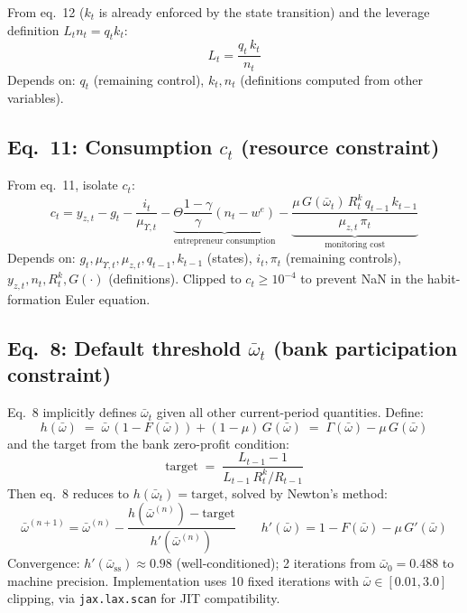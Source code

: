 From eq.~12 ($k_t$ is already enforced by the state transition) and the
leverage definition $L_t n_t = q_t k_t$:
\begin{equation*}
  \boxed{L_t = \frac{q_t\, k_t}{n_t}}
\end{equation*}
Depends on: $q_t$ (remaining control), $k_t, n_t$ (definitions computed from other variables).

\subsection*{Eq.~11: Consumption $c_t$ (resource constraint)}

From eq.~11, isolate $c_t$:
\begin{equation*}
  \boxed{c_t = y_{z,t} - g_t - \frac{i_t}{\mu_{\Upsilon,t}}
    - \underbrace{\Theta\frac{1-\gamma}{\gamma}(n_t - w^e)}_{\text{entrepreneur consumption}}
    - \underbrace{\frac{\mu\, G(\bar\omega_t)\, R_t^k\, q_{t-1}\, k_{t-1}}{\mu_{z,t}\,\pi_t}}_{\text{monitoring cost}}}
\end{equation*}
Depends on: $g_t, \mu_{\Upsilon,t}, \mu_{z,t}, q_{t-1}, k_{t-1}$ (states),
$i_t, \pi_t$ (remaining controls), $y_{z,t}, n_t, R_t^k, G(\cdot)$ (definitions).
Clipped to $c_t \geq 10^{-4}$ to prevent NaN in the habit-formation Euler equation.

\subsection*{Eq.~8: Default threshold $\bar\omega_t$ (bank participation constraint)}

Eq.~8 implicitly defines $\bar\omega_t$ given all other current-period quantities.
Define:
\begin{equation*}
  h(\bar\omega) \;=\; \bar\omega\,(1-F(\bar\omega)) + (1-\mu)\,G(\bar\omega)
  \;=\; \Gamma(\bar\omega) - \mu\,G(\bar\omega)
\end{equation*}
and the target from the bank zero-profit condition:
\begin{equation*}
  \text{target} \;=\; \frac{L_{t-1} - 1}{L_{t-1}\, R_t^k / R_{t-1}}
\end{equation*}
Then eq.~8 reduces to $h(\bar\omega_t) = \text{target}$, solved by Newton's method:
\begin{equation*}
  \boxed{\bar\omega^{(n+1)} = \bar\omega^{(n)}
    - \frac{h(\bar\omega^{(n)}) - \text{target}}{h'(\bar\omega^{(n)})}}
  \qquad
  h'(\bar\omega) = 1 - F(\bar\omega) - \mu\,G'(\bar\omega)
\end{equation*}
Convergence: $h'(\bar\omega_{\text{ss}}) \approx 0.98$ (well-conditioned); 2 iterations
from $\bar\omega_0 = 0.488$ to machine precision. Implementation uses 10 fixed iterations
with $\bar\omega \in [0.01, 3.0]$ clipping, via \texttt{jax.lax.scan} for JIT compatibility.

